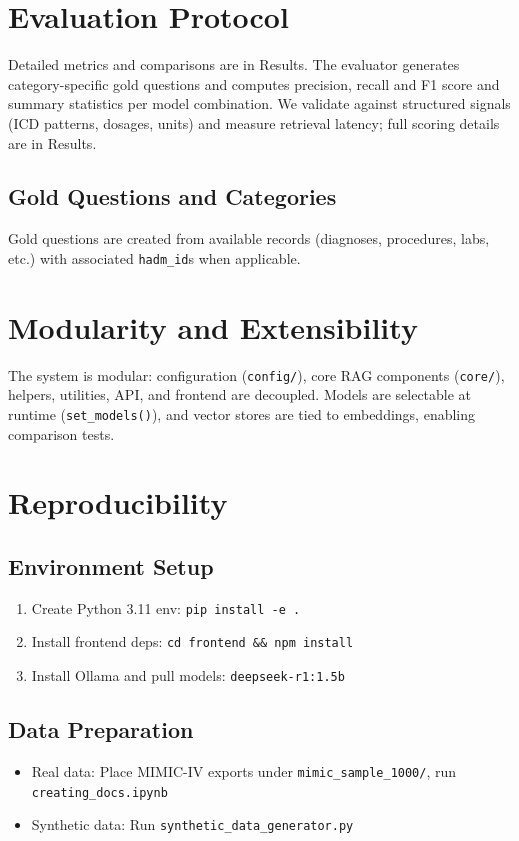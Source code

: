 \section{Evaluation Protocol}
Detailed metrics and comparisons are in Results.
The evaluator generates category-specific gold questions and computes precision, recall and F1 score and summary statistics per model combination. We validate against structured signals (ICD patterns, dosages, units) and measure retrieval latency; full scoring details are in Results.

\subsection{Gold Questions and Categories}
Gold questions are created from available records (diagnoses, procedures, labs, etc.) with associated \texttt{hadm\_id}s when applicable.

\section{Modularity and Extensibility}
The system is modular: configuration (\texttt{config/}), core RAG components (\texttt{core/}), helpers, utilities, API, and frontend are decoupled. Models are selectable at runtime (\texttt{set\_models()}), and vector stores are tied to embeddings, enabling comparison tests.

\section{Reproducibility}

\subsection{Environment Setup}
\begin{enumerate}
  \item Create Python 3.11 env: \texttt{pip install -e .}
  \item Install frontend deps: \texttt{cd frontend \&\& npm install}
  \item Install Ollama and pull models: \texttt{deepseek-r1:1.5b}
\end{enumerate}

\subsection{Data Preparation}
\begin{itemize}
  \item Real data: Place MIMIC-IV exports under \texttt{mimic\_sample\_1000/}, \break run \texttt{creating\_docs.ipynb}
  \item Synthetic data: Run \texttt{synthetic\_data\_generator.py}
\end{itemize}

